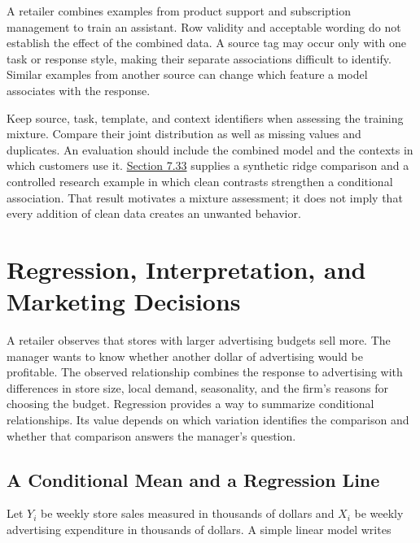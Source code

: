 \noindent \noindent A retailer combines examples from product support and
subscription management to train an assistant. Row validity and
acceptable wording do not establish the effect of the combined data. A
source tag may occur only with one task or response style, making their
separate associations difficult to identify. Similar examples from
another source can change which feature a model associates with the
response.

Keep source, task, template, and context identifiers when assessing the
training mixture. Compare their joint distribution as well as missing
values and duplicates. An evaluation should include the combined model
and the contexts in which customers use it.
\href{M07_Prediction_and_Machine_Learning.md}{Section 7.33} supplies a
synthetic ridge comparison and a controlled research example in which
clean contrasts strengthen a conditional association. That result
motivates a mixture assessment; it does not imply that every addition of
clean data creates an unwanted behavior.

\hypertarget{M03-m3.-regression-interpretation-and-marketing-decisions}{%
\chapter{Regression, Interpretation, and Marketing
Decisions}\label{M03-m3.-regression-interpretation-and-marketing-decisions}}

\noindent A retailer observes that stores with larger advertising budgets sell
more. The manager wants to know whether another dollar of advertising
would be profitable. The observed relationship combines the response to
advertising with differences in store size, local demand, seasonality,
and the firm's reasons for choosing the budget. Regression provides a
way to summarize conditional relationships. Its value depends on which
variation identifies the comparison and whether that comparison answers
the manager's question.

\hypertarget{M03-a-conditional-mean-and-a-regression-line}{%
\section{A Conditional Mean and a Regression
Line}\label{M03-a-conditional-mean-and-a-regression-line}}

\noindent Let \(Y_i\) be weekly store sales measured in thousands of dollars and
\(X_i\) be weekly advertising expenditure in thousands of dollars. A
simple linear model writes

